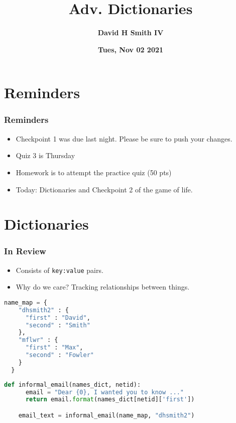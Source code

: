 \documentclass{beamer}
\title{\textbf{Adv. Dictionaries}}
\author{\textbf{David H Smith IV}}
\institute[\textbf{UIUC}]{\textbf{University of Illinois Urbana-Champaign}}
\date{\textbf{Tues, Nov 02 2021}}
\begin{document}
\frame{\titlepage}

\section{Reminders}

%
%
\begin{frame}
  \frametitle{Reminders}
  \begin{itemize}
    \item Checkpoint 1 was due last night. Please be sure to push your changes.
    \item Quiz 3 is Thursday
    \item Homework is to attempt the practice quiz (50 pts)
    \item Today: Dictionaries and Checkpoint 2 of the game of life.
  \end{itemize}
\end{frame}


\section{Dictionaries}

%
%
\begin{frame}[fragile]
  \frametitle{In Review} 
  \vfill
  \begin{minipage}{0.60\textwidth}
    \begin{itemize}
      \item Consists of \lstinline|key:value| pairs.
      \item Why do we care? Tracking relationships between things. 
    \end{itemize}
  \end{minipage}
  \begin{minipage}{0.39\textwidth} 
    \begin{lstlisting}[language=Python, autogobble]
  name_map = {
    "dhsmith2" : {
      "first" : "David",
      "second" : "Smith"
    },
    "mflwr" : {
      "first" : "Max",
      "second" : "Fowler"
    }
  }\end{lstlisting}
  \end{minipage}
  \vfill
  \begin{lstlisting}[language=Python, autogobble]
    def informal_email(names_dict, netid):
      email = "Dear {0}, I wanted you to know ..."
      return email.format(names_dict[netid]['first'])

    email_text = informal_email(name_map, "dhsmith2")
  \end{lstlisting}
\end{frame}
\end{document}
